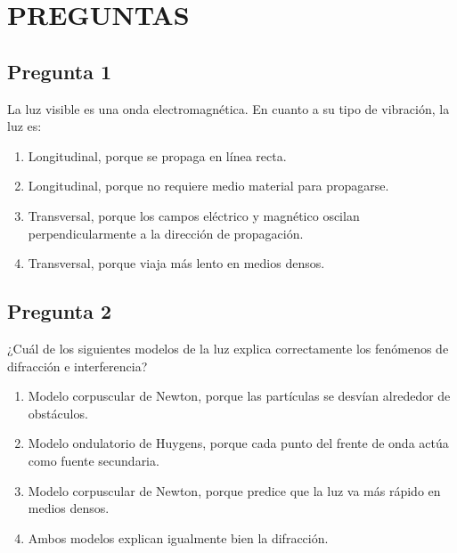 \renewcommand{\tema}{Examen Diagnóstico - Óptica}

\twocolumn
\section*{PREGUNTAS}

\begin{preguntabox}
\subsection*{Pregunta 1}
La luz visible es una onda electromagnética. En cuanto a su tipo de vibración, la luz es:

\begin{enumerate}
    \item[A)] Longitudinal, porque se propaga en línea recta.
    \item[B)] Longitudinal, porque no requiere medio material para propagarse.
    \item[C)] Transversal, porque los campos eléctrico y magnético oscilan perpendicularmente a la dirección de propagación.
    \item[D)] Transversal, porque viaja más lento en medios densos.
\end{enumerate}
\end{preguntabox}

\begin{preguntabox}
\subsection*{Pregunta 2}
¿Cuál de los siguientes modelos de la luz explica correctamente los fenómenos de difracción e interferencia?

\begin{enumerate}
    \item[A)] Modelo corpuscular de Newton, porque las partículas se desvían alrededor de obstáculos.
    \item[B)] Modelo ondulatorio de Huygens, porque cada punto del frente de onda actúa como fuente secundaria.
    \item[C)] Modelo corpuscular de Newton, porque predice que la luz va más rápido en medios densos.
    \item[D)] Ambos modelos explican igualmente bien la difracción.
\end{enumerate}
\end{preguntabox}

